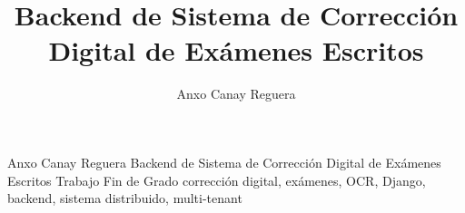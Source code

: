 
\title{Backend de Sistema de Corrección Digital de Exámenes Escritos}
\author{Anxo Canay Reguera}









\pdfmetavalues
  {Anxo Canay Reguera}
  {Backend de Sistema de Corrección Digital de Exámenes Escritos}%
  {Trabajo Fin de Grado}%
  {corrección digital, exámenes, OCR, Django, backend, sistema distribuido, multi-tenant}
